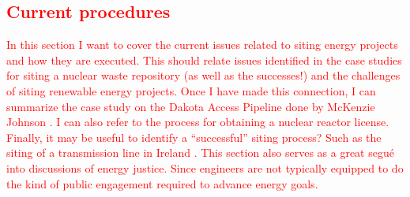 \subsection{\textcolor{red}{Current procedures}}


\textcolor{red}{In this section I want to cover the current issues related to siting 
energy projects and how they are executed. This should relate issues identified in the case studies
for siting a nuclear waste repository (as well as the successes!) and the challenges of siting renewable
energy projects. Once I have made this connection, I can summarize the case study on the Dakota Access Pipeline
done by McKenzie Johnson \cite{johnson_dakota_2021}. I can also refer to the process for obtaining a nuclear
reactor license.
Finally, it may be useful to identify a ``successful'' siting process? Such as the siting of a transmission line
in Ireland \cite{devine-wright_understanding_2020}.
This section also serves as a great segu\'{e} into discussions of energy justice. Since engineers are not 
typically equipped to do the kind of public engagement required to advance energy goals.}